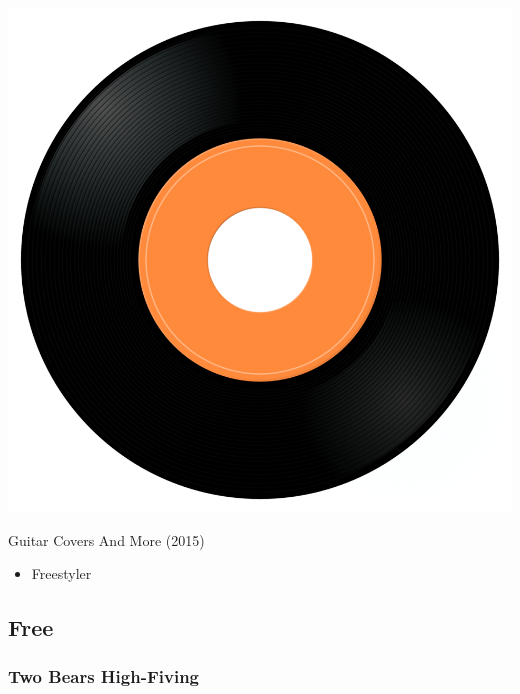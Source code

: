 \begin{minipage}[t]{0.25\textwidth}\vspace{0pt}
\captionsetup{type=figure}
\includegraphics[width=\textwidth]{Images/cover.png}
\caption*{Guitar Covers And More (2015)}
\end{minipage}
\begin{minipage}[t]{0.25\textwidth}\vspace{0pt}
\begin{itemize}[nosep,leftmargin=1em,labelwidth=*,align=left]
	\setlength{\itemsep}{0pt}
	\item Freestyler
\end{itemize}
\end{minipage}

\subsection{Free}

\subsubsection{Two Bears High-Fiving}

